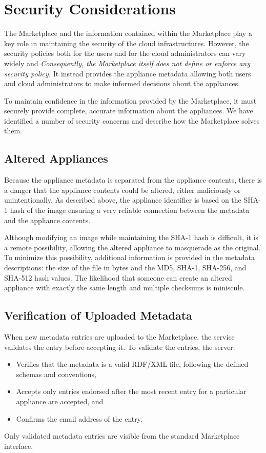\section{Security Considerations}
\label{sec:security}

The Marketplace and the information contained within the Marketplace
play a key role in maintaining the security of the cloud
infrastructures.  However, the security policies both for the users
and for the cloud administrators can vary widely and {\em
  Consequently, the Marketplace itself does not define or enforce any
  security policy.}  It instead provides the appliance metadata
allowing both users and cloud administrators to make informed
decisions about the appliances.

To maintain confidence in the information provided by the Marketplace,
it must securely provide complete, accurate information about the
appliances.  We have identified a number of security concerns and
describe how the Marketplace solves them. 

\subsection{Altered Appliances}

Because the appliance metadata is separated from the appliance
contents, there is a danger that the appliance contents could be
altered, either maliciously or unintentionally.  As described above,
the appliance identifier is based on the SHA-1 hash of the image
ensuring a very reliable connection between the metadata and the
appliance contents.

Although modifying an image while maintaining the SHA-1 hash is
difficult, it is a remote possibility, allowing the altered appliance
to masquerade as the original.  To minimize this possibility,
additional information is provided in the metadata descriptions: the
size of the file in bytes and the MD5, SHA-1, SHA-256, and SHA-512
hash values.  The likelihood that someone can create an altered
appliance with exactly the same length and multiple checksums is
miniscule.

\subsection{Verification of Uploaded Metadata}

When new metadata entries are uploaded to the Marketplace, the service
validates the entry before accepting it.  To validate the entries, the server:
\begin{itemize}
\item Verifies that the metadata is a valid RDF/XML file, following
  the defined schemas and conventions,
\item Accepts only entries endorsed after the most recent entry for a
  particular appliance are accepted, and 
\item Confirms the email address of the entry.
\end{itemize}
Only validated metadata entries are visible from the standard
Marketplace interface.

